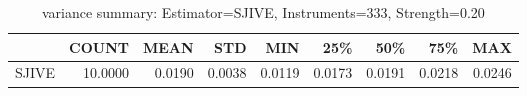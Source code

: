 \begin{table}[ht]
\centering
\caption{variance summary: Estimator=SJIVE, Instruments=333, Strength=0.20}
\begin{tabular}{lrrrrrrrr}
\toprule
 & COUNT & MEAN & STD & MIN & 25\% & 50\% & 75\% & MAX \\
\midrule
SJIVE & 10.0000 & 0.0190 & 0.0038 & 0.0119 & 0.0173 & 0.0191 & 0.0218 & 0.0246 \\
\bottomrule
\end{tabular}
\end{table}

